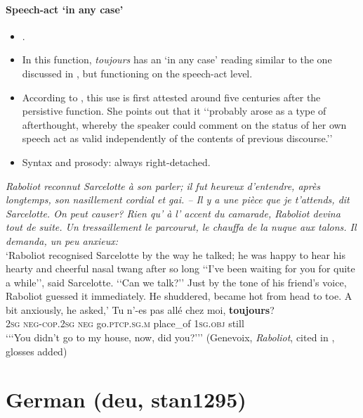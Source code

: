 \paragraph{Speech-act \lq in any case\rq{}}
\begin{itemize}
	\item \textcite[201–203]{MosegaardHansen2008}.
	\item In this function, \textit{toujours} has an \lq in any case\rq{ }reading similar to the one discussed in , but functioning on the speech-act level.
	\item According to \textcite[201–202]{MosegaardHansen2008}, this use is first attested around five centuries after the persistive function. She points out that it \lq\lq{}probably arose as a type of afterthought, whereby the speaker could comment on the status of her own speech act as valid independently of the contents of previous discourse.\rq\rq{}
	\item Syntax and prosody: always right-detached.
\end{itemize}

\begin{exe}
	\sloppy
	\ex \textit{Raboliot reconnut Sarcelotte à son parler; il fut heureux d’entendre, après longtemps, son nasillement cordial et gai. – Il y a une pièce que je t’attends,
dit Sarcelotte. On peut causer? Rien qu’ à l’ accent du camarade, Raboliot devina tout de suite. Un tressaillement le parcourut, le chauffa de la nuque aux talons. Il demanda, un peu anxieux:}\\
	\lq Raboliot recognised Sarcelotte by the way he talked; he was happy to hear his hearty and cheerful nasal twang after so long {\lq\lq}I’ve been waiting for you for quite a while\rq\rq{}, said Sarcelotte. \lq\lq{}Can we talk?\rq\rq{} Just by the tone of his friend’s voice, Raboliot guessed it immediately. He shuddered, became hot from head to toe. A bit anxiously, he asked,\rq{}
	\sn
	\gll Tu n’-es pas allé chez moi, \textbf{toujours}? \\
	2\textsc{sg} \textsc{neg}-\textsc{cop}.2\textsc{sg} \textsc{neg} go.\textsc{ptcp}.\textsc{sg}.\textsc{m} place\_of 1\textsc{sg}.\textsc{obj} still\\
	\glt \lq {\lq\lq}You didn’t go to my house, now, did you?{\rq\rq{}}\rq{ }(Genevoix, \textit{Raboliot}, cited in \cite[202]{MosegaardHansen2008}, glosses added)
\end{exe}

\section{German (deu, stan1295)}
\label{appendixGerman}



